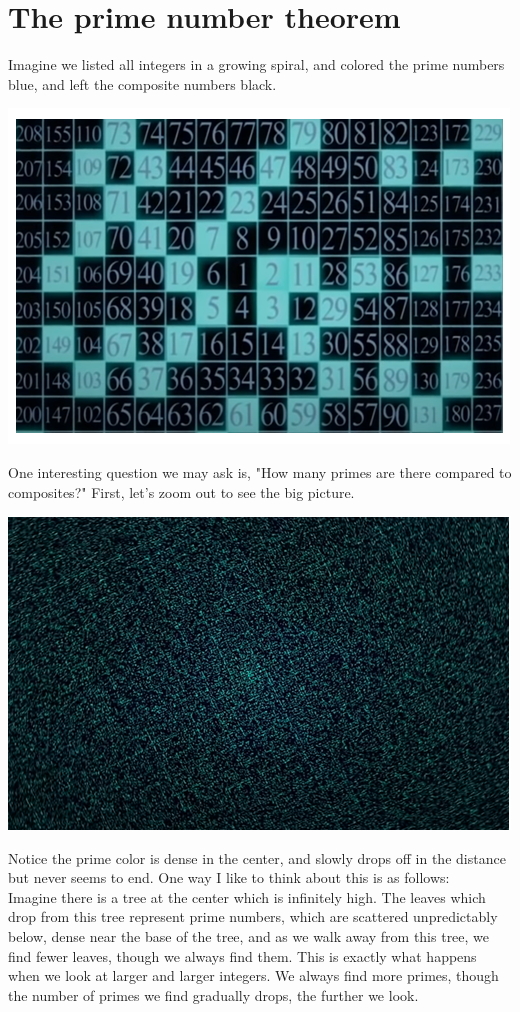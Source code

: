 \documentclass{report}
\begin{document}
\section{The prime number theorem}
Imagine we listed all integers in a growing spiral, and colored the prime numbers blue, and left the composite numbers black. 
\begin{center}
	\includegraphics[scale=1]{55.png}
\end{center}
One interesting question we may ask is, "How many primes are there compared to composites?" First, let's zoom out to see the big picture.
\begin{center}
	\includegraphics[scale=1]{56.png}
\end{center}
Notice the prime color is dense in the center, and slowly drops off in the distance but never seems to end. One way I like to think about this is as follows:\\
Imagine there is a tree at the center which is infinitely high. The leaves which drop from this tree represent prime numbers, which are scattered unpredictably below, dense near the base of the tree, and as we walk away from this tree, we find fewer leaves, though we always find them. This is exactly what happens when we look at larger and larger integers. We always find more primes, though the number of primes we find gradually drops, the further we look.\\
\end{document}
